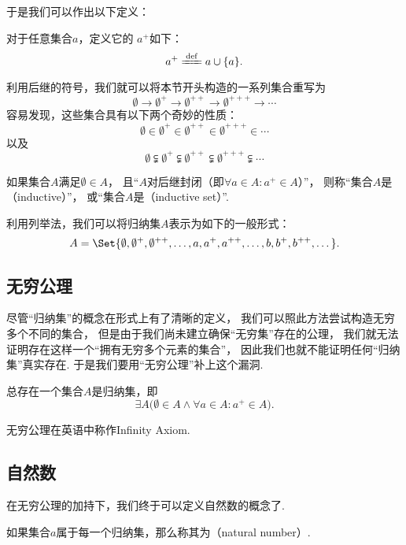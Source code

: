 于是我们可以作出以下定义：
\begin{definition}[后继]\label{definition:集合论.后继的定义}
对于任意集合\(a\)，定义它的 \(a^+\)如下：\[
a^+ \defeq a \cup \{a\}.
\]
\end{definition}
利用后继的符号，我们就可以将本节开头构造的一系列集合重写为\[
\emptyset
\to \emptyset^+
\to \emptyset^{++}
\to \emptyset^{+++}
\to \dotsb
\]容易发现，这些集合具有以下两个奇妙的性质：\[
\emptyset
\in \emptyset^+
\in \emptyset^{++}
\in \emptyset^{+++}
\in \dotsb
\]以及\[
\emptyset
\subsetneqq \emptyset^+
\subsetneqq \emptyset^{++}
\subsetneqq \emptyset^{+++}
\subsetneqq \dotsb
\]

\begin{definition}[归纳集]\label{definition:集合论.归纳集的定义}
如果集合\(A\)满足\(\emptyset \in A\)，%
且“\(A\)对后继封闭（即\(\forall a \in A : a^+ \in A\)）”，%
则称“集合\(A\)是（inductive）”，%
或“集合\(A\)是（inductive set）”.
\end{definition}
利用列举法，我们可以将归纳集\(A\)表示为如下的一般形式：\[
A = \Set{
 \emptyset, \emptyset^+, \emptyset^{++}, \dotsc,
 a, a^+, a^{++}, \dotsc,
 b, b^+, b^{++}, \dotsc
}.
\]

\subsection{无穷公理}
尽管“归纳集”的概念在形式上有了清晰的定义，%
我们可以照此方法尝试构造无穷多个不同的集合，%
但是由于我们尚未建立确保“无穷集”存在的公理，%
我们就无法证明存在这样一个“拥有无穷多个元素的集合”，%
因此我们也就不能证明任何“归纳集”真实存在.
于是我们要用“无穷公理”补上这个漏洞.
\begin{axiom}[无穷公理]
总存在一个集合\(A\)是归纳集，即\[
\exists A \bigl(
  \emptyset \in A
  \land
  \forall a \in A : a^+ \in A
\bigr).
\]
\end{axiom}
无穷公理在英语中称作Infinity Axiom.

\subsection{自然数}
在无穷公理的加持下，我们终于可以定义自然数的概念了.
\begin{definition}\label{definition:集合论.自然数的定义}
如果集合\(a\)属于每一个归纳集，那么称其为（natural number）.
\end{definition}


